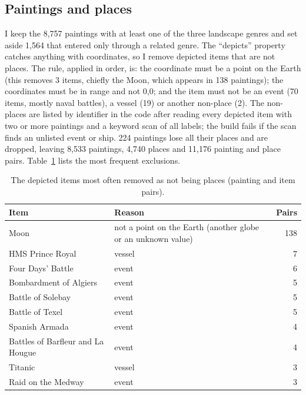 \documentclass[11pt,a4paper]{article}
\begin{document}
\subsection{Paintings and places}
I keep the 8,757 paintings with at least one of the three landscape genres and set aside 1,564 that entered only through a related genre. The ``depicts'' property catches anything with coordinates, so I remove depicted items that are not places. The rule, applied in order, is: the coordinate must be a point on the Earth (this removes 3 items, chiefly the Moon, which appears in 138 paintings); the coordinates must be in range and not 0,0; and the item must not be an event (70 items, mostly naval battles), a vessel (19) or another non-place (2). The non-places are listed by identifier in the code after reading every depicted item with two or more paintings and a keyword scan of all labels; the build fails if the scan finds an unlisted event or ship. 224 paintings lose all their places and are dropped, leaving 8,533 paintings, 4,740 places and 11,176 painting and place pairs. Table~\ref{tab:excluded} lists the most frequent exclusions.

\begin{table}[tbp]\centering\small\caption{The depicted items most often removed as not being places (painting and item pairs).}\label{tab:excluded}\begin{tabular}{p{6cm}p{6cm}r}\toprule Item & Reason & Pairs\\\midrule
Moon & not a point on the Earth (another globe or an unknown value) & 138\\
HMS Prince Royal & vessel & 7\\
Four Days' Battle & event & 6\\
Bombardment of Algiers & event & 5\\
Battle of Solebay & event & 5\\
Battle of Texel & event & 5\\
Spanish Armada & event & 4\\
Battles of Barfleur and La Hougue & event & 4\\
Titanic & vessel & 3\\
Raid on the Medway & event & 3\\
\bottomrule\end{tabular}\end{table}
\end{document}
